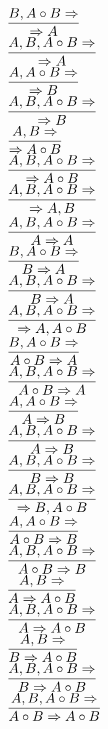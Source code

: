 \documentclass[11pt]{article}
\begin{document}
\begin{center}

$\infer{\Rightarrow A}{B, A\circ B\Rightarrow }$
\bigskip
\\$\infer{\Rightarrow A}{A, B, A\circ B\Rightarrow }$
\bigskip
\\$\infer{\Rightarrow B}{A, A\circ B\Rightarrow }$
\bigskip
\\$\infer{\Rightarrow B}{A, B, A\circ B\Rightarrow }$
\bigskip
\\$\infer{\Rightarrow A\circ B}{A, B\Rightarrow }$
\bigskip
\\$\infer{\Rightarrow A\circ B}{A, B, A\circ B\Rightarrow }$
\bigskip
\\$\infer{\Rightarrow A, B}{A, B, A\circ B\Rightarrow }$
\bigskip
\\$\infer{A\Rightarrow A}{A, B, A\circ B\Rightarrow }$
\bigskip
\\$\infer{B\Rightarrow A}{B, A\circ B\Rightarrow }$
\bigskip
\\$\infer{B\Rightarrow A}{A, B, A\circ B\Rightarrow }$
\bigskip
\\$\infer{\Rightarrow A, A\circ B}{A, B, A\circ B\Rightarrow }$
\bigskip
\\$\infer{A\circ B\Rightarrow A}{B, A\circ B\Rightarrow }$
\bigskip
\\$\infer{A\circ B\Rightarrow A}{A, B, A\circ B\Rightarrow }$
\bigskip
\\$\infer{A\Rightarrow B}{A, A\circ B\Rightarrow }$
\bigskip
\\$\infer{A\Rightarrow B}{A, B, A\circ B\Rightarrow }$
\bigskip
\\$\infer{B\Rightarrow B}{A, B, A\circ B\Rightarrow }$
\bigskip
\\$\infer{\Rightarrow B, A\circ B}{A, B, A\circ B\Rightarrow }$
\bigskip
\\$\infer{A\circ B\Rightarrow B}{A, A\circ B\Rightarrow }$
\bigskip
\\$\infer{A\circ B\Rightarrow B}{A, B, A\circ B\Rightarrow }$
\bigskip
\\$\infer{A\Rightarrow A\circ B}{A, B\Rightarrow }$
\bigskip
\\$\infer{A\Rightarrow A\circ B}{A, B, A\circ B\Rightarrow }$
\bigskip
\\$\infer{B\Rightarrow A\circ B}{A, B\Rightarrow }$
\bigskip
\\$\infer{B\Rightarrow A\circ B}{A, B, A\circ B\Rightarrow }$
\bigskip
\\$\infer{A\circ B\Rightarrow A\circ B}{A, B, A\circ B\Rightarrow }$
\bigskip

\end{center}
\end{document}
